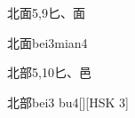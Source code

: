 \begin{entry}{北面}{5,9}{⼔、⾯}
  \begin{phonetics}{北面}{bei3mian4}
  \end{phonetics}
\end{entry}

\begin{entry}{北部}{5,10}{⼔、⾢}
  \begin{phonetics}{北部}{bei3 bu4}[][HSK 3]
  \end{phonetics}
\end{entry}


